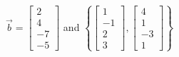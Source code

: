\documentclass{ximera}
\begin{document}
\begin{problem}
 \begin{problem}\label{prob:spanofvect3}
 $\vec{b}=\begin{bmatrix}2\\4\\-7\\-5\end{bmatrix}$ and $\left\{\begin{bmatrix}1\\-1\\2\\3\end{bmatrix}, \begin{bmatrix}4\\1\\-3\\1\end{bmatrix}\right\}$
 \begin{multipleChoice}
 \end{multipleChoice}
 \end{problem}
 
 \end{problem}
\end{document}
